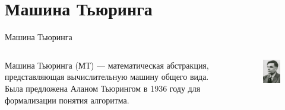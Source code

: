 \documentclass[10pt]{beamer}
\begin{document}
\section{Машина Тьюринга}



\begin{frame}{Машина Тьюринга}
\begin{columns}
\begin{column}{.48\linewidth}
Машина Тьюринга (МТ) — математическая абстракция, представляющая вычислительную машину общего вида. Была предложена 		Аланом Тьюрингом в 1936 году для формализации понятия алгоритма.
\end{column}
\begin{column}{.48\linewidth}
		\begin{figure}
		\centerline{\includegraphics[width=1.0\linewidth]{images/al_t.jpg}}
		\end{figure}
	\end{column}
	\end{columns}
\end{frame}
\end{document}
